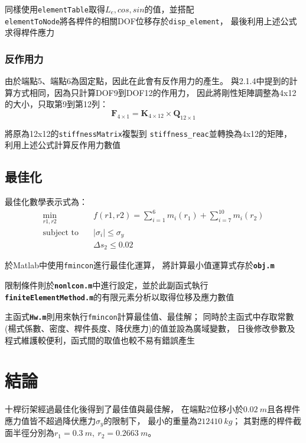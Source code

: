 \documentclass[12pt,a4paper]{article}
\begin{document}
            同樣使用\texttt{elementTable}取得$L_e,cos,sin$的值，並搭配\\
            \texttt{elementToNode}將各桿件的相關DOF位移存於\texttt{disp\_element}，
            最後利用上述公式求得桿件應力
            
            
        \subsubsection{反作用力}

            由於端點5、端點6為固定點，因此在此會有反作用力的產生。
            與2.1.4中提到的計算方式相同，因為只計算DOF9到DOF12的作用力，
            因此將剛性矩陣調整為4x12的大小，只取第9到第12列：
            \begin{displaymath}
                \mathbf{F}_{4\times1} = \mathbf{K}_{4\times12}\times\mathbf{Q}_{12\times1}
            \end{displaymath}

            將原為12x12的\texttt{stiffnessMatrix}複製到
            \texttt{stiffness\_reac}並轉換為4x12的矩陣，
            利用上述公式計算反作用力數值
            
    
    \newpage
    \subsection{最佳化}

        最佳化數學表示式為：
        \begin{align*}
            \min_{r1,r2}\quad & f\left(r1,r2\right) = \sum_{i=1}^6m_i(r_1) + \sum_{i=7}^{10}m_i(r_2) \\
            \mbox{subject to}\quad & |\sigma_i| \leq \sigma_y \\
                               & \Delta s_2 \leq 0.02
        \end{align*}
        
        於Matlab中使用\texttt{fmincon}進行最佳化運算，
        將計算最小值運算式存於\textbf{\texttt{obj.m}}
        
        限制條件則於\textbf{\texttt{nonlcon.m}}中進行設定，並於此副函式執行\\
        \textbf{\texttt{finiteElementMethod.m}}的有限元素分析以取得位移及應力數值
        
        
        主函式\textbf{\texttt{Hw.m}}則用來執行\texttt{fmincon}計算最佳值、最佳解；
        同時於主函式中存取常數(楊式係數、密度、桿件長度、降伏應力)的值並設為廣域變數，
        日後修改參數及程式維護較便利，函式間的取值也較不易有錯誤產生
        
        


\newpage

\section{結論}

    十桿衍架經過最佳化後得到了最佳值與最佳解，
    在端點2位移小於$0.02\ m$且各桿件應力值皆不超過降伏應力$\sigma_y$的限制下，
    最小的重量為$212410\ kg$；
    其對應的桿件截面半徑分別為$r_1 = 0.3\ m,\ r_2 = 0.2663\ m$。
\end{document}
